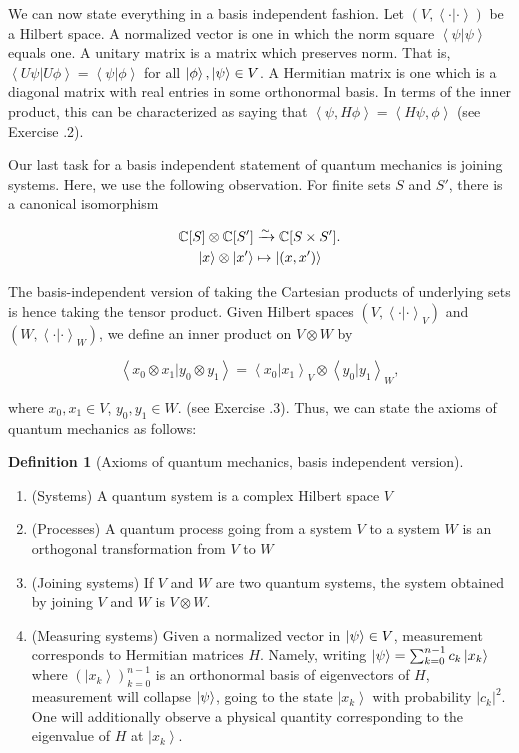 \documentclass{article}
\theoremstyle{definition}
\newtheorem*{definition}{Definition}
\numberwithin{figure}{section}
\begin{document}
We can now state everything in a basis independent fashion. Let $(V,\left<\cdot | \cdot\right>)$ be a Hilbert space. A normalized vector is one in which the norm square $\left<\psi|\psi\right>$ equals one. A unitary matrix is a matrix which preserves norm. That is, $\left<U\psi|U\phi\right>=\left<\psi|\phi\right>$ for all $\left|\phi\right>,\left|\psi\right>\in V$. A Hermitian matrix is one which is a diagonal matrix with real entries in some orthonormal basis. In terms of the inner product, this can be characterized as saying that $\left<\psi, H\phi\right>=\left<H\psi, \phi \right>$ (see Exercise \thesection.2).

Our last task for a basis independent statement of quantum mechanics is joining systems. Here, we use the following observation. For finite sets $S$ and $S'$, there is a canonical isomorphism

\begin{align*}
\mathbb{C}[S]\otimes \mathbb{C}[S']&\xrightarrow{\sim}\mathbb{C}[S\times S'].\\
\left|x\right>\otimes \left|x'\right>&\mapsto \left|(x,x')\right>
\end{align*}

The basis-independent version of taking the Cartesian products of underlying sets is hence taking the tensor product. Given Hilbert spaces $(V,\left<\cdot|\cdot\right>_V)$ and $(W,\left<\cdot|\cdot\right>_W)$, we define an inner product on $V\otimes W$ by

$$\left<x_0\otimes x_1| y_0\otimes y_1\right>=\left<x_0|x_1\right>_{V}\otimes \left<y_0|y_1\right>_W,$$

where $x_0,x_1\in V$, $y_0,y_1\in W$. (see Exercise \thesection.3). Thus, we can state the axioms of quantum mechanics as follows:

\begin{definition}[Axioms of quantum mechanics, basis independent version] $\,$

\begin{enumerate}
\item (Systems) A quantum system is a complex Hilbert space $V$
\item (Processes) A quantum process going from a system $V$ to a system $W$ is an orthogonal transformation from $V$ to $W$
\item (Joining systems) If $V$ and $W$ are two quantum systems, the system obtained by joining $V$ and $W$ is $V\otimes W$.
\item (Measuring systems) Given a normalized vector in $\left|\psi\right>\in V$, measurement corresponds to Hermitian matrices $H$. Namely, writing $\left|\psi\right>=\sum_{k=0}^{n-1}c_k\left|x_k\right>$ where $\left(\left|x_k\right>\right)_{k=0}^{n-1}$ is an orthonormal basis of eigenvectors of $H$, measurement will collapse $\left|\psi\right>$, going to the state $\left|x_k\right>$ with probability $|c_k|^2$. One will additionally observe a physical quantity corresponding to the eigenvalue of $H$ at $\left|x_k\right>$.
\end{enumerate}

\raggedleft\qedsymbol{}
\end{definition}
\end{document}
